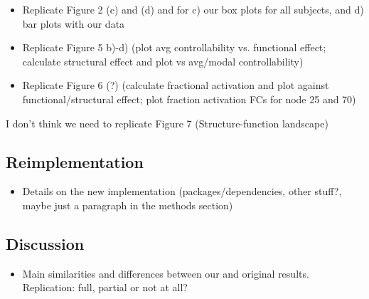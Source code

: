 \begin{itemize}
 \item 
  Replicate Figure 2 (c) and (d) 
  and for c) our box plots for all subjects, and d) bar plots with our data
  
 \item
  Replicate Figure 5 b)-d) (plot avg controllability vs. functional effect; calculate structural effect and plot vs avg/modal controllability)
  
 \item
  Replicate Figure 6 (?) (calculate fractional activation and plot against functional/structural effect; plot fraction activation FCs for node 25 and 70)
\end{itemize}

I don't think we need to replicate Figure 7 (Structure-function landscape)




\subsection{Reimplementation}

\begin{itemize}
 \item 
  Details on the new implementation (packages/dependencies, other stuff?, maybe just a paragraph in the methods section) 
\end{itemize}

 




\subsection{Discussion}

\begin{itemize}
 \item 
  Main similarities and differences between our and original results. Replication: full, partial or not at all?
\end{itemize}
